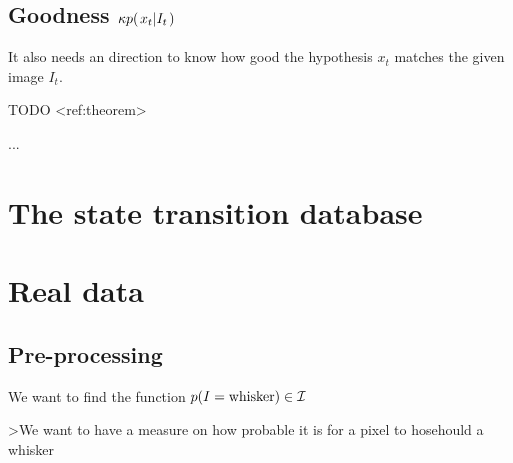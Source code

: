 \subsection{Goodness $\kappa p{(\left. x_t \middle\vert I_t \right.)}$}
It also needs an direction to know how good the hypothesis $x_t$ matches the given image $I_t$.

TODO <ref:theorem>

...

\section{The state transition database}





\section{Real data}
    \subsection{Pre-processing}

    We want to find the function $p{(I=\text{whisker})}\in\mathcal{I}$

    >We want to have a measure on how probable it is for a pixel to hosehould a whisker





